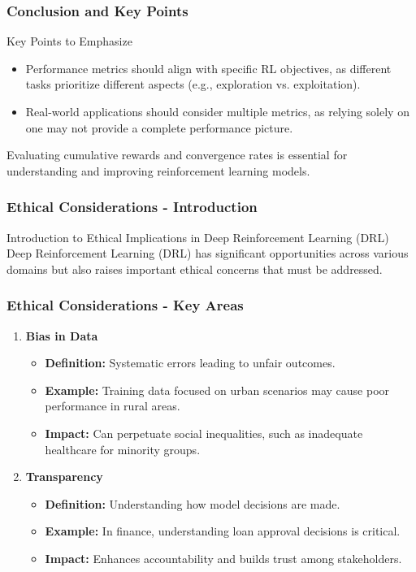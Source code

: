 \documentclass[aspectratio=169]{beamer}
\begin{document}
\begin{frame}[fragile]
    \frametitle{Conclusion and Key Points}
    \begin{block}{Key Points to Emphasize}
        \begin{itemize}
            \item Performance metrics should align with specific RL objectives, as different tasks prioritize different aspects (e.g., exploration vs. exploitation).
            \item Real-world applications should consider multiple metrics, as relying solely on one may not provide a complete performance picture.
        \end{itemize}
    \end{block}
    Evaluating cumulative rewards and convergence rates is essential for understanding and improving reinforcement learning models. 
\end{frame}

\begin{frame}[fragile]
    \frametitle{Ethical Considerations - Introduction}
    \begin{block}{Introduction to Ethical Implications in Deep Reinforcement Learning (DRL)}
        Deep Reinforcement Learning (DRL) has significant opportunities across various domains but also raises important ethical concerns that must be addressed.
    \end{block}
\end{frame}

\begin{frame}[fragile]
    \frametitle{Ethical Considerations - Key Areas}
    \begin{enumerate}
        \item \textbf{Bias in Data}
            \begin{itemize}
                \item \textbf{Definition:} Systematic errors leading to unfair outcomes.
                \item \textbf{Example:} Training data focused on urban scenarios may cause poor performance in rural areas.
                \item \textbf{Impact:} Can perpetuate social inequalities, such as inadequate healthcare for minority groups.
            \end{itemize}
        
        \item \textbf{Transparency}
            \begin{itemize}
                \item \textbf{Definition:} Understanding how model decisions are made.
                \item \textbf{Example:} In finance, understanding loan approval decisions is critical.
                \item \textbf{Impact:} Enhances accountability and builds trust among stakeholders.
            \end{itemize}
    \end{enumerate}
\end{frame}
\end{document}
